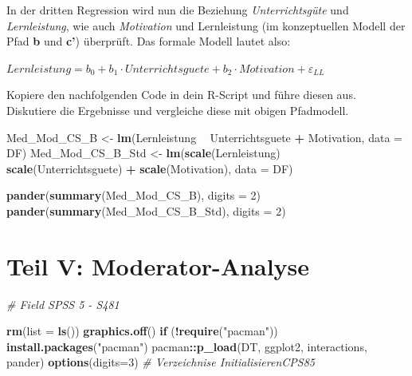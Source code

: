 \documentclass[]{article}
\newenvironment{Shaded}{\begin{snugshade}}{\end{snugshade}}
\newcommand{\CommentTok}[1]{\textcolor[rgb]{0.56,0.35,0.01}{\textit{#1}}}
\newcommand{\ControlFlowTok}[1]{\textcolor[rgb]{0.13,0.29,0.53}{\textbf{#1}}}
\newcommand{\DataTypeTok}[1]{\textcolor[rgb]{0.13,0.29,0.53}{#1}}
\newcommand{\DecValTok}[1]{\textcolor[rgb]{0.00,0.00,0.81}{#1}}
\newcommand{\KeywordTok}[1]{\textcolor[rgb]{0.13,0.29,0.53}{\textbf{#1}}}
\newcommand{\NormalTok}[1]{#1}
\newcommand{\OperatorTok}[1]{\textcolor[rgb]{0.81,0.36,0.00}{\textbf{#1}}}
\newcommand{\StringTok}[1]{\textcolor[rgb]{0.31,0.60,0.02}{#1}}
\begin{document}
In der dritten Regression wird nun die Beziehung \emph{Unterrichtsgüte} und \emph{Lernleistung}, wie auch \emph{Motivation} und Lernleistung (im konzeptuellen Modell der Pfad \textbf{b} und \textbf{c'}) überprüft. Das formale Modell lautet also:

\(Lernleistung = b_0 + b_1 \cdot Unterrichtsguete + b_2 \cdot Motivation + \varepsilon_{LL}\)

Kopiere den nachfolgenden Code in dein R-Script und führe diesen aus. Diskutiere die Ergebnisse und vergleiche diese mit obigen Pfadmodell.

\begin{Shaded}
\begin{Highlighting}[]
\NormalTok{    Med_Mod_CS_B     <-}\StringTok{ }\KeywordTok{lm}\NormalTok{(Lernleistung }\OperatorTok{~}\StringTok{ }\NormalTok{Unterrichtsguete }\OperatorTok{+}\StringTok{ }\NormalTok{Motivation, }\DataTypeTok{data =}\NormalTok{ DF)}
\NormalTok{    Med_Mod_CS_B_Std <-}\StringTok{ }\KeywordTok{lm}\NormalTok{(}\KeywordTok{scale}\NormalTok{(Lernleistung) }\OperatorTok{~}\StringTok{ }\KeywordTok{scale}\NormalTok{(Unterrichtsguete) }\OperatorTok{+}\StringTok{ }
\StringTok{                                                 }\KeywordTok{scale}\NormalTok{(Motivation), }
                                                 \DataTypeTok{data =}\NormalTok{ DF)}
    
    \KeywordTok{pander}\NormalTok{(}\KeywordTok{summary}\NormalTok{(Med_Mod_CS_B), }\DataTypeTok{digits =} \DecValTok{2}\NormalTok{)}
    \KeywordTok{pander}\NormalTok{(}\KeywordTok{summary}\NormalTok{(Med_Mod_CS_B_Std), }\DataTypeTok{digits =} \DecValTok{2}\NormalTok{)}
\end{Highlighting}
\end{Shaded}

\hypertarget{part-teil-v-moderator-analyse}{%
\part*{Teil V: Moderator-Analyse}\label{part-teil-v-moderator-analyse}}

\begin{Shaded}
\begin{Highlighting}[]
    \CommentTok{# Field SPSS 5 - S481}
    
    \KeywordTok{rm}\NormalTok{(}\DataTypeTok{list =} \KeywordTok{ls}\NormalTok{())}
    \KeywordTok{graphics.off}\NormalTok{()}
    \ControlFlowTok{if}\NormalTok{ (}\OperatorTok{!}\KeywordTok{require}\NormalTok{(}\StringTok{"pacman"}\NormalTok{)) }\KeywordTok{install.packages}\NormalTok{(}\StringTok{"pacman"}\NormalTok{)}
\NormalTok{    pacman}\OperatorTok{::}\KeywordTok{p_load}\NormalTok{(DT, ggplot2, interactions, pander)}
    \KeywordTok{options}\NormalTok{(}\DataTypeTok{digits=}\DecValTok{3}\NormalTok{)}
    \CommentTok{# Verzeichnise InitialisierenCPS85}
\end{Highlighting}
\end{Shaded}
\end{document}
